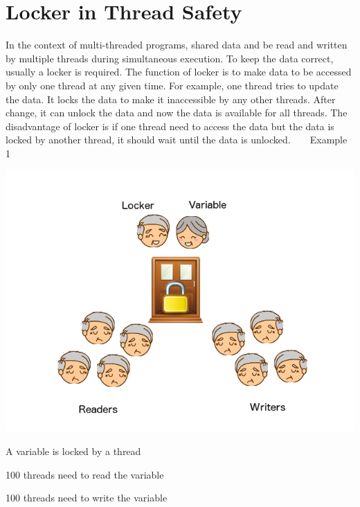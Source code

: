 \hypertarget{_overview_LockerinThreadSafety}{}\section{Locker in Thread Safety}\label{_overview_LockerinThreadSafety}
In the context of multi-\/threaded programs, shared data and be read and written by multiple threads during simultaneous execution. To keep the data correct, usually a locker is required. The function of locker is to make data to be accessed by only one thread at any given time. For example, one thread tries to update the data. It locks the data to make it inaccessible by any other threads. After change, it can unlock the data and now the data is available for all threads. The disadvantage of locker is if one thread need to access the data but the data is locked by another thread, it should wait until the data is unlocked. ~\newline
~\newline
\label{_overview_eg1}%
\hypertarget{_overview_eg1}{}%
Example 1 
\begin{DoxyImageNoCaption}
  \mbox{\includegraphics[width=\textwidth,height=\textheight/2,keepaspectratio=true]{ResearchOverviewLockerinThreadSafety.png}}
\end{DoxyImageNoCaption}

\begin{DoxyItemize}
\item A variable is locked by a thread
\item 100 threads need to read the variable
\item 100 threads need to write the variable
\end{DoxyItemize}

